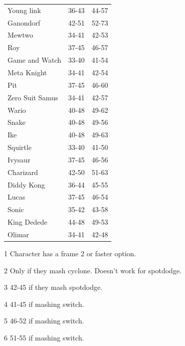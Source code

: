 \begin{table}[h]
\begin{subtable}[t]{.45\linewidth}
\begin{threeparttable}
\begin{tabular}{lcc}
            Young link        & 36-43          & 44-57 \\
            Ganondorf         & 42-51          & 52-73 \\
            Mewtwo            & 34-41          & 42-53 \\
            Roy               & 37-45          & 46-57 \\
            Game and Watch    & 33-40          & 41-54 \\
            Meta Knight       & 34-41          & 42-54 \\
            Pit               & 37-45          & 46-60 \\
            Zero Suit Samus   & 34-41          & 42-57 \\
            Wario             & 40-48          & 49-62 \\
            Snake             & 40-48          & 49-56 \\
            Ike               & 40-48          & 49-63 \\
            Squirtle          & 33-40\tnote{1} & 41-50\tnote{4} \\
            Ivysaur           & 37-45\tnote{1} & 46-56\tnote{5} \\
            Charizard         & 42-50\tnote{1} & 51-63\tnote{6} \\
            Diddy Kong        & 36-44          & 45-55 \\
            Lucas             & 37-45\tnote{1} & 46-54 \\
            Sonic             & 35-42          & 43-58 \\
            King Dedede       & 44-48          & 49-53 \\
            Olimar            & 34-41          & 42-48 \\
            \bottomrule
        \end{tabular}
        \begin{tablenotes}
            \item[1] Character has a frame 2 or faster option.
            \item[2] Only if they mash cyclone. Doesn't work for spotdodge.
            \item[3] 42-45 if they mash spotdodge.
            \item[4] 41-45 if mashing switch.
            \item[5] 46-52 if mashing switch.
            \item[6] 51-55 if mashing switch.

\end{tablenotes}
\end{threeparttable}
\end{subtable}
\end{table}
